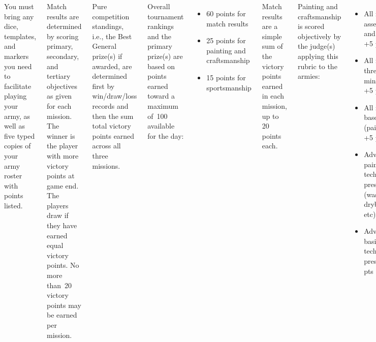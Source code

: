 \documentclass{40k}
\begin{document}
\begin{columns}
You must bring any dice, templates, and markers you need to facilitate
playing your army, as well as five typed copies of your army roster
with points listed.


%

Match results are determined by scoring primary, secondary, and
tertiary objectives as given for each mission.  The winner is the
player with more victory points at game end.  The players draw if they
have earned equal victory points.  No more than~20 victory points may
be earned per mission.

Pure competition standings, i.e., the Best General prize(s) if
awarded, are determined first by win/draw/loss records and then the
sum total victory points earned across all three missions.

Overall tournament rankings and the primary prize(s) are based on
points earned toward a maximum of~100 available for the day:
\begin{itemize}\shortlist
\item 60 points for match results
\item 25 points for painting and craftsmanship
\item 15 points for sportsmanship
\end{itemize}

Match results are a simple sum of the victory points earned in each
mission, up to 20 points each.

Painting and craftsmanship is scored objectively by the judge(s)
applying this rubric to the armies:

\begin{itemize}\shortlist
\item All models assembled and primed: +5 pts
\item All models three-color minimum: +5 pts
\item All models based (paint/flock): +5 pts
\item Advanced painting techniques present (washes, drybrushing, etc): +5 pts
\item Advanced basing techniques present: +5 pts
\end{itemize}

Sportsmanship scores include two components:
\begin{itemize}\shortlist
\item The sum of sportsmanship scores given after each mission (9 pts
  available).

\item Players ranking their opponents by most enjoyable to play (6 pts
  available).
\end{itemize}

Please make sure to submit sportsmanship scores as appropriate,
including the final ranking, as otherwise it impairs your opponents'
overall scores!

\end{columns}
\end{document}
